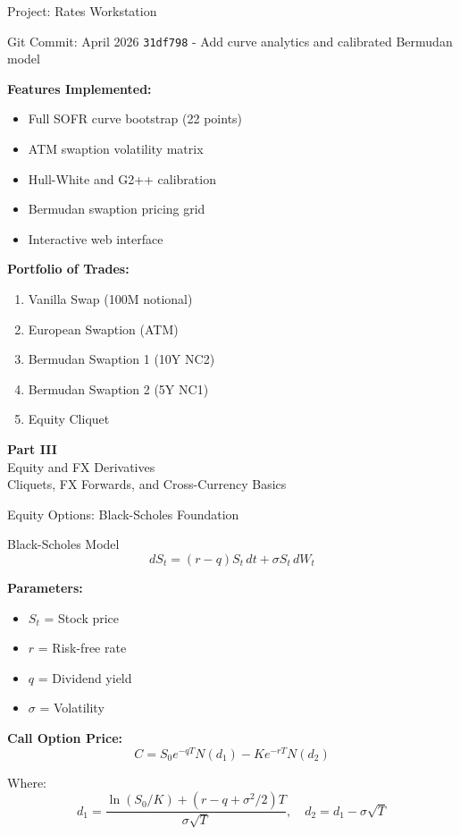 \documentclass[aspectratio=169,11pt]{beamer}
\begin{document}
\begin{frame}{Project: Rates Workstation}
\begin{block}{Git Commit: April 2026}
\texttt{31df798} - Add curve analytics and calibrated Bermudan model
\end{block}

\textbf{Features Implemented:}
\begin{itemize}
    \item Full SOFR curve bootstrap (22 points)
    \item ATM swaption volatility matrix
    \item Hull-White and G2++ calibration
    \item Bermudan swaption pricing grid
    \item Interactive web interface
\end{itemize}

\textbf{Portfolio of Trades:}
\begin{enumerate}
    \item Vanilla Swap (100M notional)
    \item European Swaption (ATM)
    \item Bermudan Swaption 1 (10Y NC2)
    \item Bermudan Swaption 2 (5Y NC1)
    \item Equity Cliquet
\end{enumerate}
\end{frame}


\begin{frame}{}
\begin{center}
\Huge\textbf{Part III}\\[1cm]
\Large Equity and FX Derivatives\\[0.5cm]
\normalsize Cliquets, FX Forwards, and Cross-Currency Basics
\end{center}
\end{frame}

\begin{frame}{Equity Options: Black-Scholes Foundation}
\begin{block}{Black-Scholes Model}
\[
dS_t = (r - q) S_t\, dt + \sigma S_t\, dW_t
\]
\end{block}

\textbf{Parameters:}
\begin{itemize}
    \item $S_t$ = Stock price
    \item $r$ = Risk-free rate
    \item $q$ = Dividend yield
    \item $\sigma$ = Volatility
\end{itemize}

\textbf{Call Option Price:}
\[
C = S_0 e^{-qT} N(d_1) - K e^{-rT} N(d_2)
\]

Where:
\[
d_1 = \frac{\ln(S_0/K) + (r-q+\sigma^2/2)T}{\sigma\sqrt{T}}, \quad d_2 = d_1 - \sigma\sqrt{T}
\]
\end{frame}
\end{document}
